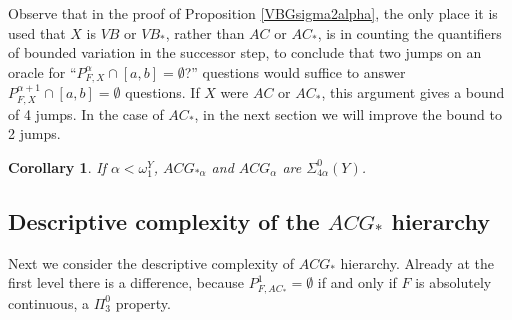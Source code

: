 \documentclass[12pt]{amsart}
\newtheorem{cor}[theorem]{Corollary}
\begin{document}
Observe that in the proof of Proposition \ref{VBGsigma2alpha}, 
the only place it is used that $X$ is $VB$ or $VB_\ast$, 
rather than $AC$ or $AC_\ast$, is in counting the quantifiers 
of bounded variation in the successor step, to conclude that 
two jumps on an oracle for ``$P^\alpha_{F,X} \cap [a,b] = \emptyset$?'' 
questions would suffice to answer $P^{\alpha+1}_{F,X} \cap [a,b] = \emptyset$ 
questions.  If $X$ were $AC$ or $AC_\ast$, this argument gives 
a bound of 4 jumps.  In the case of $AC_\ast$, in the next section 
we will improve the bound to 2 jumps.  

\begin{cor}
If $\alpha<\omega_1^Y$, $ACG_{\ast\alpha}$ and $ACG_\alpha$ are 
$\Sigma^0_{4\alpha}(Y)$.
\end{cor}




\subsection{Descriptive complexity of the $ACG_\ast$ hierarchy}


Next we consider the descriptive complexity of $ACG_\ast$ hierarchy.
Already at the first level there is a difference, because 
$P^1_{F,AC_\ast} = \emptyset$ if and only if $F$ is absolutely continuous, 
a $\Pi^0_3$ property.
\end{document}
